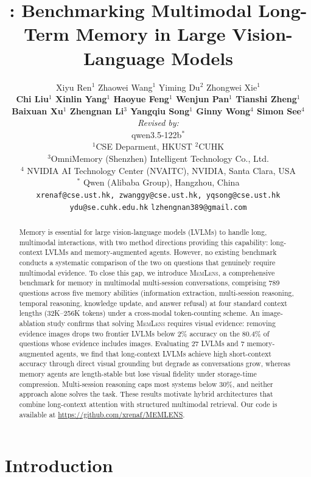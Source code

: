 \documentclass{llmxive}
\title{\bench{}: Benchmarking Multimodal Long-Term Memory in Large Vision-Language Models}
\author{Xiyu Ren$^{1}$ \quad
  Zhaowei Wang$^{1}$ \quad
  Yiming Du$^{2}$ \quad
  Zhongwei Xie$^{1}$ \\
  \textbf{
  Chi Liu$^{1}$ \quad
  Xinlin Yang$^{1}$ \quad
  Haoyue Feng$^{1}$ \quad
  Wenjun Pan$^{1}$ \quad
  Tianshi Zheng$^{1}$} \\
  \textbf{Baixuan Xu$^{1}$ \quad
  Zhengnan Li$^{3}$ \quad
  Yangqiu Song$^{1}$ \quad
  Ginny Wong$^{4}$ \quad
  Simon See$^{4}$} \\[6pt]
  \textit{Revised by:} \\
  qwen3.5-122b$^{*}$ \\[6pt]
  $^{1}$CSE Deparment, HKUST \quad $^{2}$CUHK \\
  $^{3}$OmniMemory (Shenzhen) Intelligent Technology Co., Ltd. \\
  $^{4}$ NVIDIA AI Technology Center (NVAITC), NVIDIA, Santa Clara, USA \\
  $^{*}$ Qwen (Alibaba Group), Hangzhou, China \\[4pt]
  \texttt{xrenaf@cse.ust.hk, zwanggy@cse.ust.hk, yqsong@cse.ust.hk} \\
    \texttt{ydu@se.cuhk.edu.hk} \quad \texttt{lzhengnan389@gmail.com}}
\providecommand{\bench}{\textsc{MemLens}}
\begin{document}
\maketitle
\begin{abstract}
Memory is essential for large vision-language models (LVLMs) to handle long, multimodal interactions, with two method directions providing this capability: long-context LVLMs and memory-augmented agents. However, no existing benchmark conducts a systematic comparison of the two on questions that genuinely require multimodal evidence. To close this gap, we introduce \bench{}, a comprehensive benchmark for memory in multimodal multi-session conversations, comprising 789 questions across five memory abilities (information extraction, multi-session reasoning, temporal reasoning, knowledge update, and answer refusal) at four standard context lengths (32K--256K tokens) under a cross-modal token-counting scheme. An image-ablation study confirms that solving \bench{} requires visual evidence: removing evidence images drops two frontier LVLMs below 2\% accuracy on the 80.4\% of questions whose evidence includes images. Evaluating 27 LVLMs and 7 memory-augmented agents, we find that long-context LVLMs achieve high short-context accuracy through direct visual grounding but degrade as conversations grow, whereas memory agents are length-stable but lose visual fidelity under storage-time compression. Multi-session reasoning caps most systems below 30\%, and neither approach alone solves the task. These results motivate hybrid architectures that combine long-context attention with structured multimodal retrieval. Our code is available at \url{https://github.com/xrenaf/MEMLENS}.
\end{abstract}
\section{Introduction}
\label{sec:intro}
\end{document}
